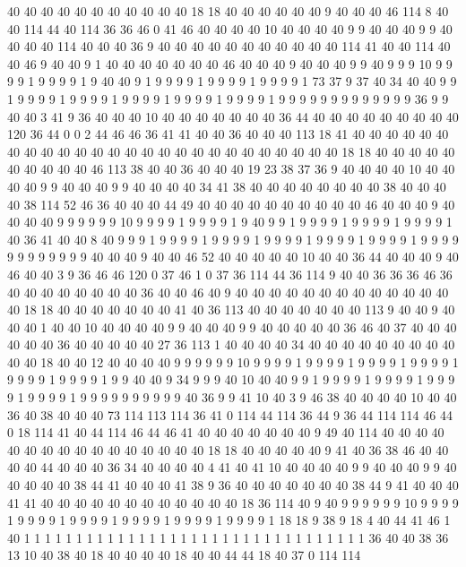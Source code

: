 40 40 40 40 40 40 40 40 40 40 40 18 18 40 40 40 40 40 40 9
40 40 40 46 114 8 40 40 114 44 40 114 36 36 46 0 41 46 40 40
40 40 10 40 40 40 40 9 9 40 40 40 9 9 40 40 40 40 114 40
40 40 36 9 40 40 40 40 40 40 40 40 40 40 40 114 41 40 40 114
40 40 46 9 40 40 9 1 40 40 40 40 40 40 40 46 40 40 40 9
40 40 40 9 9 40 9 9 9 10 9 9 9 9 1 9 9 9 9 1
9 40 40 9 1 9 9 9 9 1 9 9 9 9 1 9 9 9 9 1
73 37 9 37 40 34 40 40 9 9 1 9 9 9 9 1 9 9 9 9
1 9 9 9 9 1 9 9 9 9 1 9 9 9 9 1 9 9 9 9
9 9 9 9 9 9 9 9 9 36 9 9 40 40 3 41 9 36 40 40
40 10 40 40 40 40 40 40 40 36 44 40 40 40 40 40 40 40 40 40
120 36 44 0 0 2 44 46 46 36 41 41 40 40 36 40 40 40 113 18
41 40 40 40 40 40 40 40 40 40 40 40 40 40 40 40 40 40 40 40
40 40 40 40 40 40 40 18 18 40 40 40 40 40 40 40 40 40 40 46
113 38 40 40 36 40 40 40 19 23 38 37 36 9 40 40 40 40 10 40
40 40 40 9 9 40 40 40 9 9 40 40 40 40 34 41 38 40 40 40
40 40 40 40 40 38 40 40 40 40 38 114 52 46 36 40 40 40 44 49
40 40 40 40 40 40 40 40 40 40 46 40 40 40 9 40 40 40 40 9
9 9 9 9 9 10 9 9 9 9 1 9 9 9 9 1 9 40 9 9
1 9 9 9 9 1 9 9 9 9 1 9 9 9 9 1 40 36 41 40
40 8 40 9 9 9 1 9 9 9 9 1 9 9 9 9 1 9 9 9
9 1 9 9 9 9 1 9 9 9 9 1 9 9 9 9 9 9 9 9
9 9 9 9 40 40 40 9 40 40 46 52 40 40 40 40 40 10 40 40
36 44 40 40 40 9 40 46 40 40 3 9 36 46 46 120 0 37 46 1
0 37 36 114 44 36 114 9 40 40 36 36 36 46 36 40 40 40 40 40
40 40 40 36 40 40 46 40 9 40 40 40 40 40 40 40 40 40 40 40
40 40 40 18 18 40 40 40 40 40 40 40 41 40 36 113 40 40 40 40
40 40 40 113 9 40 40 9 40 40 40 1 40 40 10 40 40 40 40 9
9 40 40 40 9 9 40 40 40 40 40 36 46 40 37 40 40 40 40 40
40 36 40 40 40 40 40 27 36 113 1 40 40 40 40 34 40 40 40 40
40 40 40 40 40 40 40 18 40 40 12 40 40 40 40 9 9 9 9 9
9 10 9 9 9 9 1 9 9 9 9 1 9 9 9 9 1 9 9 9
9 1 9 9 9 9 1 9 9 9 9 1 9 9 40 40 9 34 9 9
9 40 10 40 40 9 9 1 9 9 9 9 1 9 9 9 9 1 9 9
9 9 1 9 9 9 9 1 9 9 9 9 9 9 9 9 9 9 40 36
9 9 41 10 40 3 9 46 38 40 40 40 40 10 40 40 36 40 38 40
40 40 73 114 113 114 36 41 0 114 44 114 36 44 9 36 44 114 114 46
44 0 18 114 41 40 44 114 46 44 46 41 40 40 40 40 40 40 40 9
49 40 114 40 40 40 40 40 40 40 40 40 40 40 40 40 40 40 40 18
18 40 40 40 40 40 9 41 40 36 38 46 40 40 40 40 44 40 40 40
36 34 40 40 40 40 4 41 40 41 10 40 40 40 40 9 9 40 40 40
9 9 40 40 40 40 40 38 44 41 40 40 40 41 38 9 36 40 40 40
40 40 40 40 38 44 9 41 40 40 40 41 41 40 40 40 40 40 40 40
40 40 40 40 40 18 36 114 40 9 40 9 9 9 9 9 9 10 9 9
9 9 1 9 9 9 9 1 9 9 9 9 1 9 9 9 9 1 9 9
9 9 1 9 9 9 9 1 18 18 9 38 9 18 4 40 44 41 46 1
40 1 1 1 1 1 1 1 1 1 1 1 1 1 1 1 1 1 1 1
1 1 1 1 1 1 1 1 1 1 1 1 1 1 36 40 40 38 36 13
10 40 38 40 18 40 40 40 40 18 40 40 44 44 18 40 37 0 114 114
